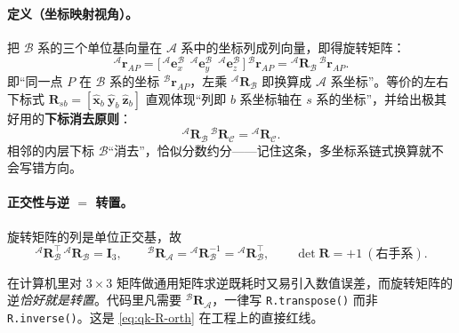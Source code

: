 \paragraph{定义（坐标映射视角）。}
把 $\mathcal{B}$ 系的三个单位基向量在 $\mathcal{A}$ 系中的坐标列成列向量，即得旋转矩阵\cite{yu2021quadruped,unitree2023quadruped}：
\begin{equation}
  {}^{\mathcal{A}}\boldsymbol{r}_{AP}=\big[\,{}^{\mathcal{A}}\mathbf{e}_x^{\mathcal{B}}\ \ {}^{\mathcal{A}}\mathbf{e}_y^{\mathcal{B}}\ \ {}^{\mathcal{A}}\mathbf{e}_z^{\mathcal{B}}\,\big]\,{}^{\mathcal{B}}\boldsymbol{r}_{AP}
  ={}^{\mathcal{A}}\mathbf{R}_{\mathcal{B}}\,{}^{\mathcal{B}}\boldsymbol{r}_{AP}.
  \label{eq:qk-R-def}
\end{equation}
即“同一点 $P$ 在 $\mathcal{B}$ 系的坐标 ${}^{\mathcal{B}}\boldsymbol{r}_{AP}$，左乘 ${}^{\mathcal{A}}\mathbf{R}_{\mathcal{B}}$ 即换算成 $\mathcal{A}$ 系坐标”。等价的左右下标式 $\mathbf{R}_{sb}=[\hat{\boldsymbol{x}}_b\ \hat{\boldsymbol{y}}_b\ \hat{\boldsymbol{z}}_b]$ 直观体现“列即 $b$ 系坐标轴在 $s$ 系的坐标”，并给出极其好用的\textbf{下标消去原则}\cite{unitree2023quadruped}：
\begin{equation}
  {}^{\mathcal{A}}\mathbf{R}_{\mathcal{B}}\,{}^{\mathcal{B}}\mathbf{R}_{\mathcal{C}}={}^{\mathcal{A}}\mathbf{R}_{\mathcal{C}}.
  \label{eq:qk-R-cancel}
\end{equation}
相邻的内层下标 $\mathcal{B}$“消去”，恰似分数约分——记住这条，多坐标系链式换算就不会写错方向。

\paragraph{正交性与逆 $=$ 转置。}
旋转矩阵的列是单位正交基，故\cite{yu2021quadruped,unitree2023quadruped}
\begin{equation}
  {}^{\mathcal{A}}\mathbf{R}_{\mathcal{B}}^{\top}\,{}^{\mathcal{A}}\mathbf{R}_{\mathcal{B}}=\mathbf{I}_3,\qquad
  {}^{\mathcal{B}}\mathbf{R}_{\mathcal{A}}={}^{\mathcal{A}}\mathbf{R}_{\mathcal{B}}^{-1}={}^{\mathcal{A}}\mathbf{R}_{\mathcal{B}}^{\top},\qquad
  \det\mathbf{R}=+1\ (\text{右手系}).
  \label{eq:qk-R-orth}
\end{equation}

\begin{pitfall}[误区：对旋转矩阵求逆而非转置]
在计算机里对 $3\times3$ 矩阵做通用矩阵求逆既耗时又易引入数值误差，而旋转矩阵的逆\emph{恰好就是转置}\cite{unitree2023quadruped}。代码里凡需要 ${}^{\mathcal{B}}\mathbf{R}_{\mathcal{A}}$，一律写 \texttt{R.transpose()} 而非 \texttt{R.inverse()}。这是 \cref{eq:qk-R-orth} 在工程上的直接红线。
\end{pitfall}

